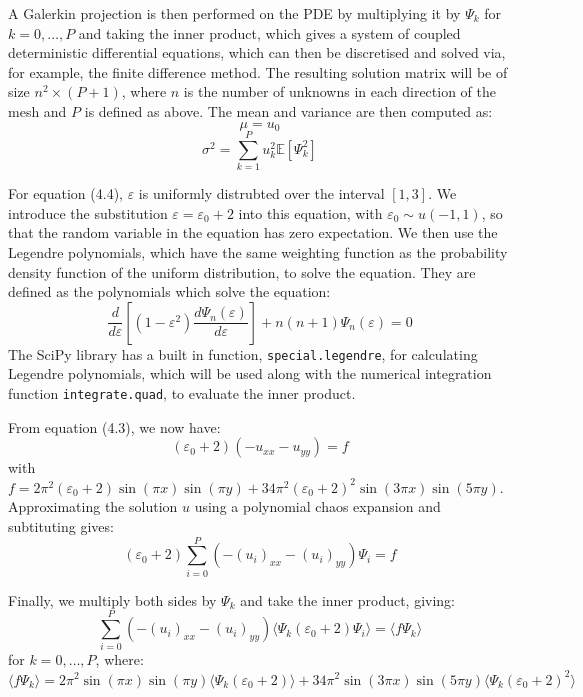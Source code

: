 \documentclass[11pt]{article}
\numberwithin{equation}{section}
\begin{document}
A Galerkin projection is then performed on the PDE by multiplying it by $\Psi_k$ for $k=0, \dots, P$ and taking the inner product, which gives a system of coupled deterministic differential equations, which can then be discretised and solved via, for example, the finite difference method. The resulting solution matrix will be of size $n^2 \times (P+1)$, where $n$ is the number of unknowns in each direction of the mesh and $P$ is defined as above. The mean and variance are then computed as:
\begin{equation}
\mu = u_0
\end{equation}
\begin{equation}
\sigma^2 = \sum_{k=1}^P u_k^2 \mathbb{E}[\Psi_k^2]
\end{equation}

For equation (4.4), $\varepsilon$ is uniformly distrubted over the interval $[1,3]$. We introduce the substitution $\varepsilon = \varepsilon_0 + 2$ into this equation, with $\varepsilon_0 \sim u(-1,1)$, so that the random variable in the equation has zero expectation. We then use the Legendre polynomials, which have the same weighting function as the probability density function of the uniform distribution, to solve the equation. They are defined as the polynomials which solve the equation:
\begin{equation}
\frac{d}{d\varepsilon} \left[ (1-\varepsilon^2) \frac{d\Psi_n(\varepsilon)}{d\varepsilon} \right] + n(n+1) \Psi_n(\varepsilon) = 0 
\end{equation}
The SciPy library has a built in function, \texttt{special.legendre}, for calculating Legendre polynomials, which will be used along with the numerical integration function \texttt{integrate.quad}, to evaluate the inner product. 

From equation (4.3), we now have:
\begin{equation}
(\varepsilon_0+2)(- u_{xx} - u_{yy}) = f
\end{equation}
with $f = 2\pi^2 (\varepsilon_0 +2) \sin(\pi x) \sin(\pi y)+ 34 \pi^2 (\varepsilon_0 + 2)^2 \sin(3 \pi x) \sin(5 \pi y)$. Approximating the solution $u$ using a polynomial chaos expansion and subtituting gives:
\begin{equation}
(\varepsilon_0 + 2) \sum_{i=0}^P (-(u_i)_{xx} -(u_i)_{yy}) \Psi_i = f
\end{equation}

Finally, we multiply both sides by $\Psi_k$ and take the inner product, giving:
\begin{equation}
\sum_{i=0}^P (-(u_i)_{xx} -(u_i)_{yy}) \langle \Psi_k (\varepsilon_0 + 2) \Psi_i \rangle = \langle f \Psi_k \rangle
\end{equation}
for $k = 0, \dots, P$, where:
\begin{equation}
\langle f \Psi_k \rangle = 2\pi^2 \sin(\pi x) \sin(\pi y) \langle \Psi_k (\varepsilon_0 + 2) \rangle
+ 34 \pi^2 \sin(3 \pi x) \sin(5 \pi y) \langle \Psi_k (\varepsilon_0 + 2)^2 \rangle
\end{equation}
\end{document}
